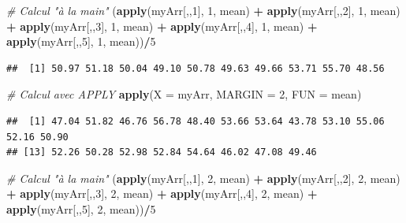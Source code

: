 \documentclass[
]{book}
\newenvironment{Shaded}{\begin{snugshade}}{\end{snugshade}}
\newcommand{\CommentTok}[1]{\textcolor[rgb]{0.56,0.35,0.01}{\textit{#1}}}
\newcommand{\DataTypeTok}[1]{\textcolor[rgb]{0.13,0.29,0.53}{#1}}
\newcommand{\DecValTok}[1]{\textcolor[rgb]{0.00,0.00,0.81}{#1}}
\newcommand{\KeywordTok}[1]{\textcolor[rgb]{0.13,0.29,0.53}{\textbf{#1}}}
\newcommand{\NormalTok}[1]{#1}
\newcommand{\OperatorTok}[1]{\textcolor[rgb]{0.81,0.36,0.00}{\textbf{#1}}}
\newcommand{\StringTok}[1]{\textcolor[rgb]{0.31,0.60,0.02}{#1}}
\begin{document}
\begin{Shaded}
\begin{Highlighting}[]
\CommentTok{# Calcul "à la main"}
\NormalTok{(}\KeywordTok{apply}\NormalTok{(myArr[,,}\DecValTok{1}\NormalTok{], }\DecValTok{1}\NormalTok{, mean) }\OperatorTok{+}\StringTok{ }\KeywordTok{apply}\NormalTok{(myArr[,,}\DecValTok{2}\NormalTok{], }\DecValTok{1}\NormalTok{, mean) }\OperatorTok{+}\StringTok{ }
\StringTok{  }\KeywordTok{apply}\NormalTok{(myArr[,,}\DecValTok{3}\NormalTok{], }\DecValTok{1}\NormalTok{, mean) }\OperatorTok{+}\StringTok{ }\KeywordTok{apply}\NormalTok{(myArr[,,}\DecValTok{4}\NormalTok{], }\DecValTok{1}\NormalTok{, mean) }\OperatorTok{+}\StringTok{ }
\StringTok{  }\KeywordTok{apply}\NormalTok{(myArr[,,}\DecValTok{5}\NormalTok{], }\DecValTok{1}\NormalTok{, mean))}\OperatorTok{/}\DecValTok{5}
\end{Highlighting}
\end{Shaded}

\begin{verbatim}
##  [1] 50.97 51.18 50.04 49.10 50.78 49.63 49.66 53.71 55.70 48.56
\end{verbatim}

\begin{Shaded}
\begin{Highlighting}[]
\CommentTok{# Calcul avec APPLY}
\KeywordTok{apply}\NormalTok{(}\DataTypeTok{X =}\NormalTok{ myArr, }\DataTypeTok{MARGIN =} \DecValTok{2}\NormalTok{, }\DataTypeTok{FUN =}\NormalTok{ mean)}
\end{Highlighting}
\end{Shaded}

\begin{verbatim}
##  [1] 47.04 51.82 46.76 56.78 48.40 53.66 53.64 43.78 53.10 55.06 52.16 50.90
## [13] 52.26 50.28 52.98 52.84 54.64 46.02 47.08 49.46
\end{verbatim}

\begin{Shaded}
\begin{Highlighting}[]
\CommentTok{# Calcul "à la main"}
\NormalTok{(}\KeywordTok{apply}\NormalTok{(myArr[,,}\DecValTok{1}\NormalTok{], }\DecValTok{2}\NormalTok{, mean) }\OperatorTok{+}\StringTok{ }\KeywordTok{apply}\NormalTok{(myArr[,,}\DecValTok{2}\NormalTok{], }\DecValTok{2}\NormalTok{, mean) }\OperatorTok{+}\StringTok{ }
\StringTok{  }\KeywordTok{apply}\NormalTok{(myArr[,,}\DecValTok{3}\NormalTok{], }\DecValTok{2}\NormalTok{, mean) }\OperatorTok{+}\StringTok{ }\KeywordTok{apply}\NormalTok{(myArr[,,}\DecValTok{4}\NormalTok{], }\DecValTok{2}\NormalTok{, mean) }\OperatorTok{+}\StringTok{ }
\StringTok{  }\KeywordTok{apply}\NormalTok{(myArr[,,}\DecValTok{5}\NormalTok{], }\DecValTok{2}\NormalTok{, mean))}\OperatorTok{/}\DecValTok{5}
\end{Highlighting}
\end{Shaded}
\end{document}

